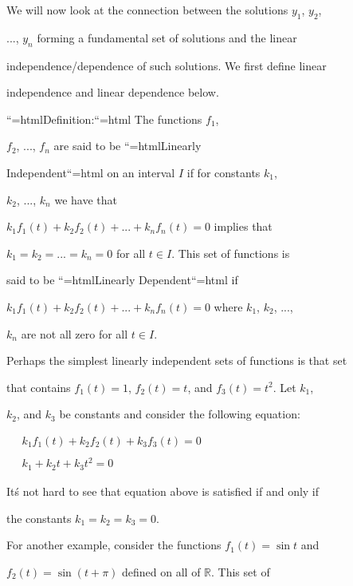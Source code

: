 We will now look at the connection between the solutions $y_1$, $y_2$,

..., $y_n$ forming a fundamental set of solutions and the linear

independence/dependence of such solutions. We first define linear

independence and linear dependence below.







``{=html}Definition:``{=html} The functions $f_1$,

$f_2$, ..., $f_n$ are said to be ``{=html}Linearly

Independent``{=html} on an interval $I$ if for constants $k_1$,

$k_2$, ..., $k_n$ we have that

$k_1f_1(t) + k_2f_2(t) + ... + k_nf_n(t) = 0$ implies that

$k_1 = k_2 = ... = k_n = 0$ for all $t \in I$. This set of functions is

said to be ``{=html}Linearly Dependent``{=html} if

$k_1f_1(t) + k_2f_2(t) + ... + k_nf_n(t) = 0$ where $k_1$, $k_2$, ...,

$k_n$ are not all zero for all $t \in I$.







Perhaps the simplest linearly independent sets of functions is that set

that contains $f_1(t) = 1$, $f_2(t) = t$, and $f_3(t) = t^2$. Let $k_1$,

$k_2$, and $k_3$ be constants and consider the following equation:



$\begin{aligned} \quad k_1f_1(t) + k_2f_2(t) + k_3f_3(t) = 0 \\\\ \quad k_1 + k_2t + k_3t^2 = 0 \end{aligned}$



It\'s not hard to see that equation above is satisfied if and only if

the constants $k_1 = k_2 = k_3 = 0$.



For another example, consider the functions $f_1(t) = \sin t$ and

$f_2(t) = \sin (t + \pi)$ defined on all of $\mathbb{R}$. This set of

